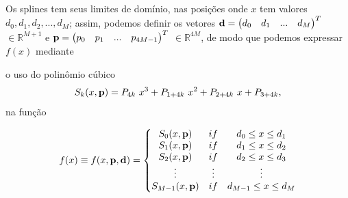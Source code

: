 Os splines tem seus limites de domínio, nas posições onde $x$ tem valores 
$d_{0}, d_{1}, d_{2}, ..., d_{M}$;
assim, podemos definir os vetores 
$\VECTOR{d}=\left(\begin{matrix}d_0 & d_1 & ...  & d_{M}\end{matrix}\right)^T$ $\in \mathbb{R}^{M+1}$ e
$\VECTOR{p}=\left(\begin{matrix}p_0 & p_1 & ...  & p_{4M-1}\end{matrix}\right)^T$ $\in \mathbb{R}^{4M}$,
de modo que podemos expressar $f(x)$ mediante

o uso do polinômio cúbico
\begin{equation}
 S_k(x,\VECTOR{p})=P_{4k}~x^3+P_{1+4k}~x^2+P_{2+4k}~x+P_{3+4k},
\end{equation}
na função

\begin{equation}
f(x)\equiv f(x,\VECTOR{p},\VECTOR{d})= \left\{\begin{matrix}
S_0(x,\VECTOR{p}) & if & d_0 \leq x \leq d_1 \\ 
S_1(x,\VECTOR{p}) & if & d_1 \leq x \leq d_2 \\ 
S_2(x,\VECTOR{p}) & if & d_2 \leq x \leq d_3 \\ 
\vdots & \vdots & \vdots \\
S_{M-1}(x,\VECTOR{p}) & if & d_{M-1} \leq x \leq d_{M} \\  
\end{matrix}\right.
\end{equation}

